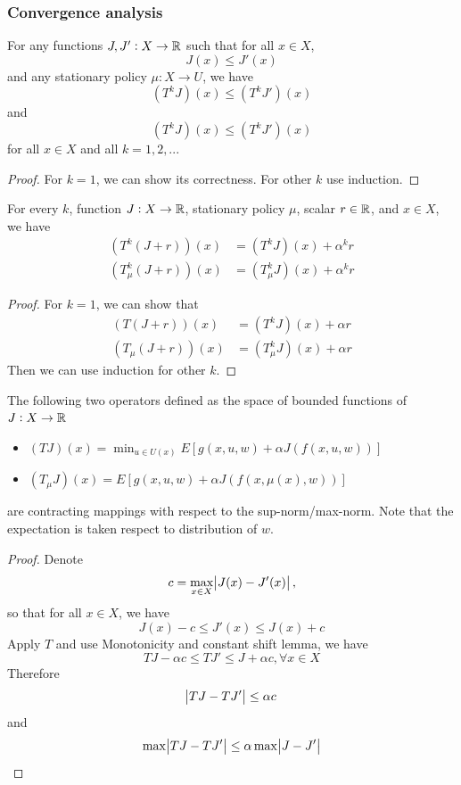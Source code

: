 \begin{refsection}
\subsubsection{Convergence analysis}

\begin{lemma}\cite[9]{bertsekas2012dynamic2}
	For any functions $J,J':X\to \mathbb{R}$ such that for all $x\in X$,
	$$J(x) \leq J'(x)$$ 
	and any stationary policy $\mu:X\to U$, we have
	$$(T^kJ)(x) \leq (T^kJ')(x)$$
	and
	$$(T^kJ)(x) \leq (T^kJ')(x)$$
	for all $x\in X$ and all $k=1,2,...$
\end{lemma}
\begin{proof}
	For $k=1$, we can show its correctness. For other $k$ use induction.
\end{proof}


\begin{lemma}\cite[9]{bertsekas2012dynamic2}
	For every $k$, function $J:X\to \mathbb{R}$, stationary policy $\mu$, scalar $r\in \mathbb{R}$, and $x\in X$, we have
	\begin{align*}
	(T^k(J+r))(x) &= (T^kJ)(x) + \alpha^k r\\
	(T^k_\mu(J+r))(x) &= (T^k_\mu J)(x) + \alpha^k r
	\end{align*}
\end{lemma}
\begin{proof}
	For $k=1$, we can show that 
	\begin{align*}
	(T(J+r))(x) &= (T^kJ)(x) + \alpha r\\
	(T_\mu(J+r))(x) &= (T^k_\mu J)(x) + \alpha r
	\end{align*}
	Then we can use induction for other $k$.
\end{proof}



\begin{theorem}\cite[18]{bertsekas2012dynamic}\label{ch:stochastic-optimal-control:dynamicprogrammingcontracting}
	The following two operators defined as the space of bounded functions of $J:X\to \mathbb{R}$
	\begin{itemize}
		\item $(TJ)(x) = \min_{u\in U(x)} E[g(x,u,w) + \alpha J(f(x,u,w))]$
		\item $(T_\mu J)(x) =  E[g(x,u,w) + \alpha J(f(x,\mu(x),w))]$	
	\end{itemize}
	are	contracting mappings with respect to the sup-norm/max-norm. Note that the expectation is taken respect to distribution of $w$.
\end{theorem}
\begin{proof}
	Denote $$c = \max_{x\in X}\abs{J(x) - J'(x)},$$
	so that for all $x\in X$, we have
	$$J(x) - c \leq J'(x) \leq J(x) + c$$
	Apply $T$ and use Monotonicity and constant shift lemma, we have
	$$TJ - \alpha c \leq TJ' \leq J +\alpha c, \forall x\in X$$
	Therefore
	$$\abs{TJ - TJ'} \leq \alpha c$$
	and 
	$$\max \abs{TJ - TJ'} \leq \alpha \max \abs{J - J'}$$
\end{proof}


\end{refsection}
